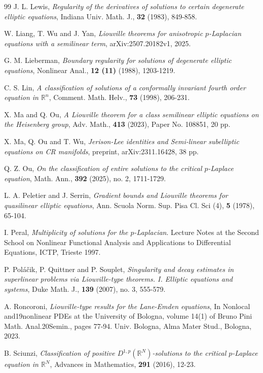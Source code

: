 \documentclass[12pt]{amsart}
\theoremstyle{definition}
\theoremstyle{remark}
\theoremstyle{conclusion}
\theoremstyle{conjecture}
\numberwithin{equation}{section}
\begin{document}
\begin{thebibliography}{99}
 J. L. Lewis, {\it Regularity of the derivatives of solutions to certain degenerate elliptic equations}, Indiana Univ. Math. J., \textbf{32} (1983), 849-858.

 W. Liang, T. Wu and J. Yan, {\it Liouville theorems for anisotropic $p$-Laplacian equations with a semilinear term}, arXiv:2507.20182v1, 2025.

 G. M. Lieberman, {\it Boundary regularity for solutions of degenerate elliptic equations}, Nonlinear Anal., \textbf{12 (11)} (1988), 1203-1219.

 C. S. Lin, {\it A classification of solutions of a conformally invariant fourth order equation in $\mathbb{R}^{n}$}, Comment. Math. Helv., \textbf{73} (1998), 206-231.

 X. Ma and Q. Ou, {\it A Liouville theorem for a class semilinear elliptic equations on the Heisenberg group}, Adv. Math., \textbf{413} (2023), Paper No. 108851, 20 pp.

 X. Ma, Q. Ou and T. Wu, {\it Jerison-Lee identities and Semi-linear subelliptic equations on CR manifolds}, preprint, arXiv:2311.16428, 38 pp.

 Q. Z. Ou, {\it On the classification of entire solutions to the critical $p$-Laplace equation}, Math. Ann., \textbf{392} (2025), no. 2, 1711-1729.

 L. A. Peletier and J. Serrin, {\it Gradient bounds and Liouville theorems for quasilinear elliptic equations}, Ann. Scuola Norm. Sup. Pisa Cl. Sci (4), \textbf{5} (1978), 65-104.

 I. Peral, {\it Multiplicity of solutions for the $p$-Laplacian}. Lecture Notes at the Second School on Nonlinear Functional Analysis and Applications to Differential Equations, ICTP, Trieste 1997.

 P. Pol\'{a}\v{c}ik, P. Quittner and P. Souplet, {\it Singularity and decay estimates in superlinear problems via Liouville-type theorems. I. Elliptic equations and systems}, Duke Math. J.,  \textbf{139} (2007), no. 3, 555-579.

 A. Roncoroni, {\it Liouville-type results for the Lane-Emden equations}, In Nonlocal and19nonlinear PDEs at the University of Bologna, volume 14(1) of Bruno Pini Math. Anal.20Semin., pages 77-94. Univ. Bologna, Alma Mater Stud., Bologna, 2023.

 B. Sciunzi, {\it Classification of positive $D^{1,p}(\mathbb{R}^N)$-solutions to the critical $p$-Laplace equation in $\mathbb{R}^N$}, Advances in Mathematics, \textbf{291} (2016), 12-23.


\end{thebibliography}
\end{document}
